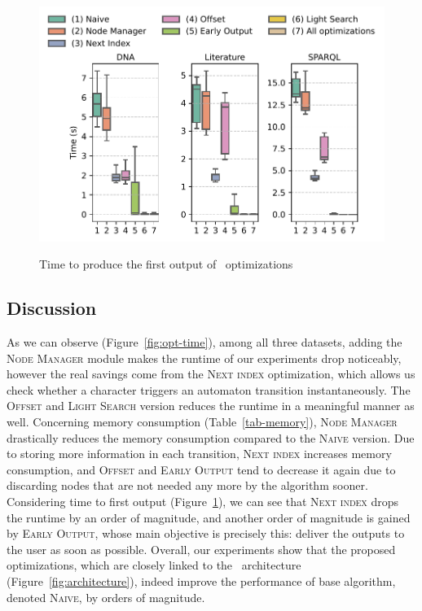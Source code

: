 \begin{figure}[t]
	\centering
	\includegraphics[width=.8\textwidth]{figures/versions-fot.pdf}
	\label{fig:opt-firstOT}
	\caption{Time to produce the first output of \rematch\ optimizations}
	\label{fig-optimizations}
\end{figure}




\subsection{Discussion}
As we can observe (Figure~\ref{fig:opt-time}), among all three datasets, adding the \textsc{Node Manager} module makes the runtime of our experiments drop noticeably, however the real savings come from the \textsc{Next index} optimization, which allows us check whether a character triggers an automaton transition instantaneously. The \textsc{Offset} and \textsc{Light Search} version reduces the runtime in a meaningful manner as well. Concerning memory consumption (Table~\ref{tab-memory}), \textsc{Node Manager} drastically reduces the memory consumption compared to the \textsc{Naive} version. Due to storing more information in each transition, \textsc{Next index} increases memory consumption, and \textsc{Offset} and \textsc{Early Output} tend to decrease it again due to discarding nodes that are not needed any more by the algorithm sooner. Considering time to first output (Figure~\ref{fig-optimizations}), we can see that \textsc{Next index} drops the runtime by an order of magnitude, and another order of magnitude is gained by \textsc{Early Output}, whose main objective is precisely this: deliver the outputs to the user as soon as possible. Overall, our experiments show that the proposed optimizations, which are closely linked to the \rematch\ architecture (Figure~\ref{fig:architecture}), indeed improve the performance of base algorithm, denoted \textsc{Naive}, by orders of magnitude.


